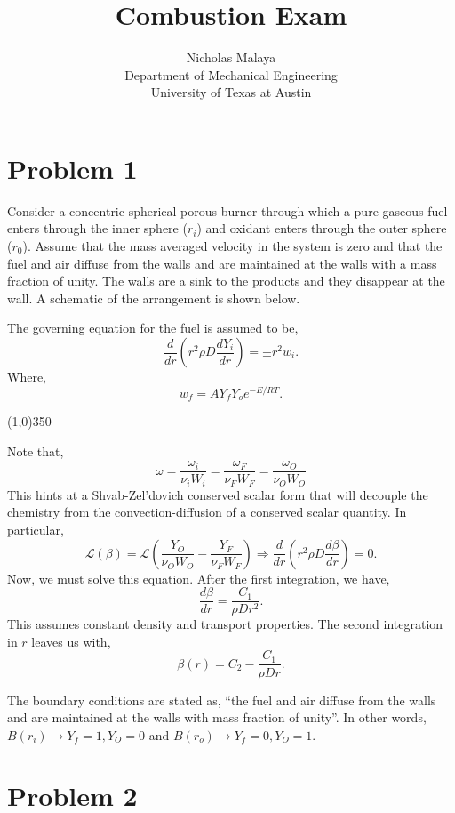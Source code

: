 \documentclass{article}
\title{\bf{Combustion Exam}}
\author{Nicholas Malaya\\ Department of Mechanical Engineering \\
University of Texas at Austin}
\date{}
\begin{document}
\maketitle

\newpage
\section*{Problem 1}
Consider a concentric spherical porous burner through which a pure
gaseous fuel enters through the inner sphere ($r_i$) and oxidant enters
through the outer sphere ($r_0$). Assume that the mass averaged velocity
in the system is zero and that the fuel and air diffuse from the walls
and are maintained at the walls with a mass fraction of unity. The walls
are a sink to the products and they disappear at the wall. A schematic
of the arrangement is shown below. 

The governing equation for the fuel is assumed to be, 
\begin{equation*}
 \frac{d}{dr}\left( r^2 \rho D \frac{dY_i}{dr}\right) = \pm r^2 w_i. 
\end{equation*}
Where, 
\begin{equation*}
 w_f = A Y_f Y_o e^{-E/RT}.
\end{equation*}
\begin{center}
\line(1,0){350}
\end{center}
Note that, 
\begin{equation*}
\omega = \frac{\omega_i}{\nu_i W_i}= \frac{\omega_F}{\nu_F W_F} =
 \frac{\omega_O}{\nu_O W_O} 
\end{equation*}
This hints at a Shvab-Zel'dovich conserved scalar form that will
decouple the chemistry from the convection-diffusion of a conserved
scalar quantity. In particular, 
\begin{equation*}
\mathcal{L}\left(\beta \right) = \mathcal{L}\left( \frac{Y_O}{\nu_O W_O}
	    - \frac{Y_F}{\nu_F W_F} \right) \Rightarrow \frac{d}{dr}\left( r^2
	    \rho D \frac{d \beta}{dr}\right) = 0 .
\end{equation*}
Now, we must solve this equation. After the first integration, we have, 
\begin{equation*}
\frac{d \beta}{dr} = \frac{C_1}{ \rho D r^2 }.
\end{equation*}
This assumes constant density and transport properties. The second
integration in $r$ leaves us with, 
\begin{equation*}
\beta(r) = C_2 - \frac{C_1}{ \rho D r }.
\end{equation*}

The boundary conditions are stated as, ``the fuel and air diffuse from the walls
and are maintained at the walls with mass fraction of unity''. In other
words, $B(r_i) \rightarrow Y_f = 1, Y_O = 0 $ and $B(r_o) \rightarrow
Y_f = 0, Y_O = 1$. 

\newpage
\section*{Problem 2}
\end{document}
